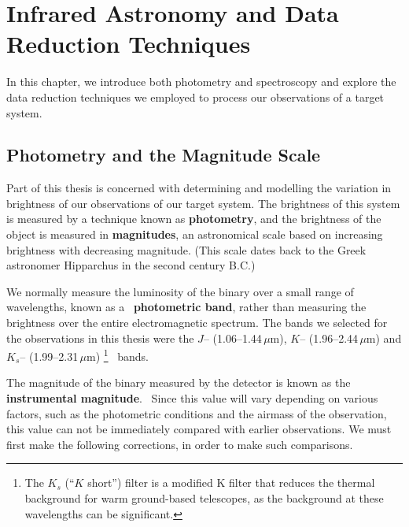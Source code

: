 
\chapter{Infrared Astronomy and Data Reduction Techniques}
\label{cha:InfraredDataReductionTechniques}

In this chapter, we introduce both photometry and spectroscopy and explore the data reduction techniques we employed to process our observations of a target system. %


\section{Photometry and the Magnitude Scale}
\label{cha:InfraredDataReductionTechniques:sec:MagnitudeScale}

Part of this thesis is concerned with determining and modelling the
variation in brightness of our observations of our target system. The brightness of this system is measured by a technique known as \textbf{photometry}, %
and the brightness of the object is measured in \textbf{magnitudes}, %
an astronomical scale based on increasing
brightness with decreasing magnitude. %
(This scale dates back to the Greek astronomer Hipparchus in
the second century B.C.) %

\vspace{\myparskip}

We normally measure the luminosity of the binary over a
small range of wavelengths, known as a%
\ \textbf{photometric band}, rather than measuring the brightness over the entire
electromagnetic spectrum. The bands we selected for the observations in this thesis were the $J$--
(1.06--1.44$\,\mu \mathrm{m}$), $K$-- (1.96--2.44$\,\mu \mathrm{m}$) and
$K_s$-- (1.99--2.31$\,\mu\mathrm{m}$)%
\footnote{%
\label{cha:InfraredDataReductionTechniques:sec:MagnitudeScale:subsec:Photometry:foot:Ks}
The $K_s$ (``$K$ short'') filter is a modified K filter
that reduces the thermal background for warm ground-based
telescopes, as the background at these wavelengths can be significant.}%
\ bands. %

\vspace{\myparskip}

The magnitude of the binary measured by the detector is known as the \textbf{instrumental magnitude}.%
\ Since this value will vary depending on various factors, such as the photometric conditions and the airmass of the observation, this value can not be immediately compared with earlier observations. We must first make the following corrections, in order to make such comparisons. %

